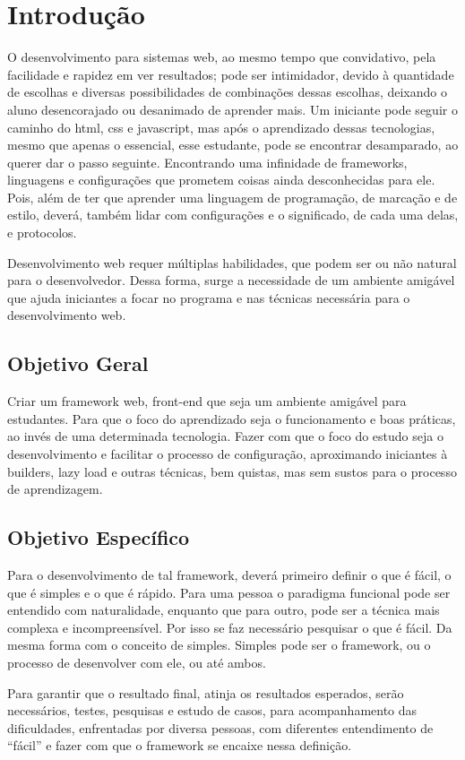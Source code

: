 \chapter[Introdução]{Introdução}
\par O desenvolvimento para sistemas web, ao mesmo tempo que convidativo, pela facilidade e rapidez em ver resultados; 
pode ser intimidador, devido à quantidade de escolhas e diversas possibilidades de combinações dessas escolhas, deixando 
o aluno desencorajado ou desanimado de aprender mais. Um iniciante pode seguir o caminho do html, css e javascript, 
mas após o aprendizado dessas tecnologias, mesmo que apenas o essencial, esse estudante, pode se encontrar desamparado, 
ao querer dar o passo seguinte. Encontrando uma infinidade de frameworks, linguagens e configurações que prometem coisas 
ainda desconhecidas para ele. Pois, além de ter que aprender uma linguagem de programação, de marcação e de estilo, deverá, 
também lidar com configurações e o significado, de cada uma delas, e protocolos.
\par Desenvolvimento web requer múltiplas habilidades, que podem ser ou não natural para o desenvolvedor. Dessa forma, 
surge a necessidade de um  ambiente amigável que ajuda iniciantes a focar no programa e nas técnicas necessária para o 
desenvolvimento web.

\section{Objetivo Geral}
\par Criar um framework web, front-end que seja um ambiente amigável para estudantes. Para que o foco do aprendizado seja o 
funcionamento e boas práticas, ao invés de uma determinada tecnologia. Fazer com que o foco do estudo seja o desenvolvimento 
e facilitar o processo de configuração, aproximando iniciantes à builders, lazy load e outras técnicas, bem quistas, mas sem 
sustos para o processo de aprendizagem.

\section{Objetivo Específico}
\par Para o desenvolvimento de tal framework, deverá primeiro definir o que é fácil, o que é simples e o que é rápido. 
Para uma pessoa o paradigma funcional pode ser entendido com naturalidade, enquanto que para outro, pode ser a técnica 
mais complexa e incompreensível. Por isso se faz necessário pesquisar o que é fácil.
Da mesma forma com o conceito de simples. Simples pode ser o framework, ou o processo de desenvolver com ele, ou até ambos. 
\par Para garantir que o resultado final, atinja os resultados esperados, serão necessários, testes, pesquisas e estudo 
de casos, para acompanhamento das dificuldades, enfrentadas por diversa pessoas, com diferentes entendimento de “fácil” e  
fazer com que o framework se encaixe nessa definição. 

